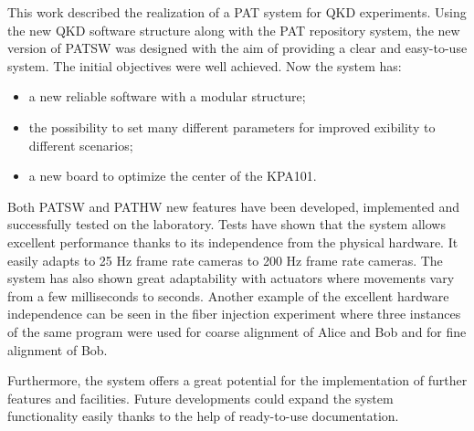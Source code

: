 This work described the realization of a PAT system for QKD experiments. Using the new QKD software structure along with the PAT repository system, the new version of PATSW was designed with the aim of providing a clear and easy-to-use system. The initial objectives were well achieved. Now the system has:
\begin{itemize}
  \item a new reliable software with a modular structure;
  \item the possibility to set many different parameters for improved exibility to different scenarios;
  \item a new board to optimize the center of the KPA101.
\end{itemize}
Both PATSW and PATHW new features have been developed, implemented and
successfully tested on the laboratory. Tests have shown that the system allows excellent performance thanks to its independence from the physical hardware. It easily adapts to 25 Hz frame rate cameras to 200 Hz frame rate cameras. The system has also shown great adaptability with actuators where movements vary from a few milliseconds to seconds. Another example of the excellent hardware independence can be seen in the fiber injection experiment where three instances of the same program were used for coarse alignment of Alice and Bob and for fine alignment of Bob.

Furthermore, the system offers a great potential for the implementation of further
features and facilities. Future developments could expand the system functionality easily thanks to the help of ready-to-use documentation.